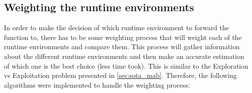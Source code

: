 \documentclass[conference]{IEEEtran}
\begin{document}


\subsection{Weighting the runtime environments}

In order to make the decision of which runtime environment to forward the function
to, there has to be some weighting process that will weight each of the runtime
environments and compare them. This process will gather information about the
different runtime environments and then make an accurate estimation of which one
is the best choice (less time took). This is similar to the Exploration vs
Exploitation problem presented in \ref{sec:sota_mab}. Therefore, the following
algorithms were implemented to handle the weighting process:
\end{document}
